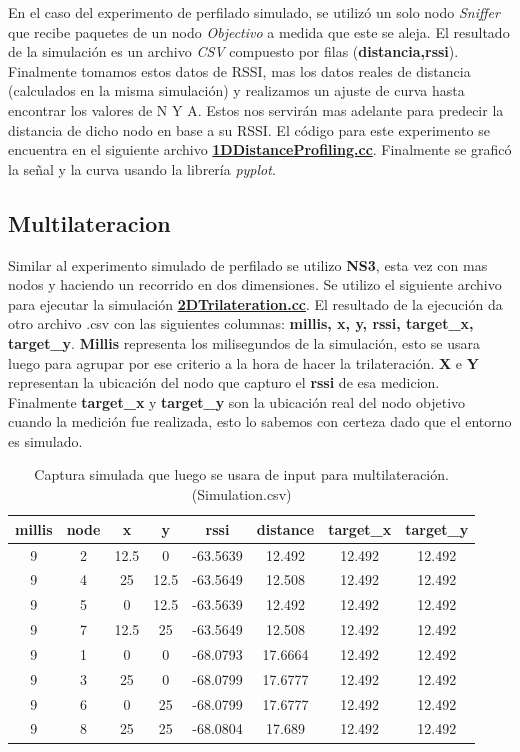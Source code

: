 En el caso del experimento de perfilado simulado, se utilizó un solo nodo \textit{Sniffer} que recibe paquetes de un nodo \textit{Objectivo} a medida que este se aleja. El resultado de la simulación es un archivo \textit{CSV} compuesto por filas (\textbf{distancia,rssi}). Finalmente tomamos estos datos de RSSI, mas los datos reales de distancia (calculados en la misma simulación) y realizamos un ajuste de curva hasta encontrar los valores de N Y A. Estos nos servirán mas adelante para predecir la distancia de dicho nodo en base a su RSSI.
 El código para este experimento se encuentra en el siguiente archivo \href{https://github.com/agusalex/ns3-rssi-trilateration/blob/main/src/1DDistanceProfiling.cc}{\textbf{1DDistanceProfiling.cc}}.
Finalmente se graficó la señal y la curva usando la librería \textit{pyplot}.


\subsection{Multilateracion}

Similar al experimento simulado de perfilado se utilizo \textbf{NS3}, esta vez con mas nodos y haciendo un recorrido en dos dimensiones. Se utilizo el siguiente archivo para ejecutar la simulación \href{https://github.com/agusalex/ns3-rssi-trilateration/blob/main/src/2DTrilateration.cc}{\textbf{2DTrilateration.cc}}. El resultado de la ejecución da otro archivo .csv con las siguientes columnas: \textbf{millis, x, y, rssi, target\_x, target\_y}. \textbf{Millis} representa los milisegundos de la simulación, esto se usara luego para agrupar por ese criterio a la hora de hacer la trilateración. \textbf{X} e \textbf{Y} representan la ubicación del nodo que capturo el \textbf{rssi} de esa medicion. Finalmente \textbf{target\_x} y \textbf{target\_y} son la ubicación real del nodo objetivo cuando la medición fue realizada, esto lo sabemos con certeza dado que el entorno es simulado.

\begin{table}[!htb]
\centering
\begin{tabular}{|c|c|c|c|c|c|c|c|}
\hline
millis & node & x & y & rssi & distance & target\_x & target\_y \\
\hline
9 & 2 & 12.5 & 0 & -63.5639 & 12.492 & 12.492 & 12.492 \\
9 & 4 & 25 & 12.5 & -63.5649 & 12.508 & 12.492 & 12.492 \\
9 & 5 & 0 & 12.5 & -63.5639 & 12.492 & 12.492 & 12.492 \\
9 & 7 & 12.5 & 25 & -63.5649 & 12.508 & 12.492 & 12.492 \\
9 & 1 & 0 & 0 & -68.0793 & 17.6664 & 12.492 & 12.492 \\
9 & 3 & 25 & 0 & -68.0799 & 17.6777 & 12.492 & 12.492 \\
9 & 6 & 0 & 25 & -68.0799 & 17.6777 & 12.492 & 12.492 \\
9 & 8 & 25 & 25 & -68.0804 & 17.689 & 12.492 & 12.492 \\
\hline
\end{tabular}
\caption{Captura simulada que luego se usara de input para multilateración. (Simulation.csv)}
\label{table:1}
\end{table}

